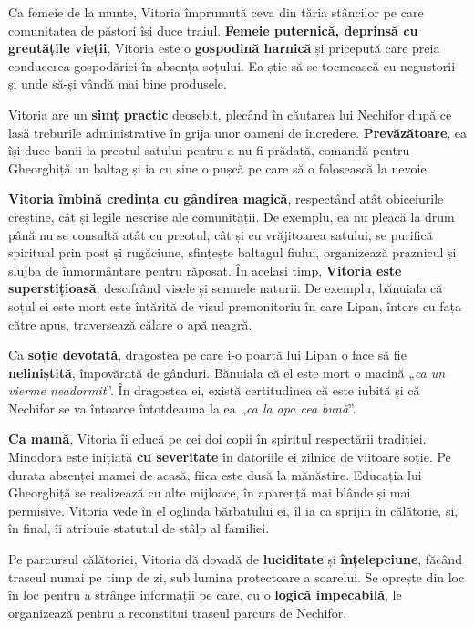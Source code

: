 \documentclass{article}
\newcommand{\qu}[1]{„\emph{#1}”}
\begin{document}
Ca femeie de la munte, Vitoria împrumută ceva din tăria stâncilor pe care comunitatea de păstori își duce traiul. \textbf{Femeie puternică, deprinsă cu greutățile vieții}, Vitoria este o \textbf{gospodină harnică} și pricepută care preia conducerea gospodăriei în absența soțului. Ea știe să se tocmească cu negustorii și unde să-și vândă mai bine produsele.

Vitoria are un \textbf{simț practic} deosebit, plecând în căutarea lui Nechifor după ce lasă treburile administrative în grija unor oameni de încredere. \textbf{Prevăzătoare}, ea își duce banii la preotul satului pentru a nu fi prădată, comandă pentru Gheorghiță un baltag și ia cu sine o pușcă pe care să o folosească la nevoie.

\textbf{Vitoria îmbină credința cu gândirea magică}, respectând atât obiceiurile creștine, cât și legile nescrise ale comunității. De exemplu, ea nu pleacă la drum până nu se consultă atât cu preotul, cât și cu vrăjitoarea satului, se purifică spiritual prin post și rugăciune, sfințește baltagul fiului, organizează praznicul și slujba de înmormântare pentru răposat. În același timp, \textbf{Vitoria este superstițioasă}, descifrând visele și semnele naturii. De exemplu, bănuiala că soțul ei este mort este întărită de visul premonitoriu în care Lipan, întors cu fața către apus, traversează călare o apă neagră.

Ca \textbf{soție devotată}, dragostea pe care i-o poartă lui Lipan o face să fie \textbf{neliniștită}, împovărată de gânduri. Bănuiala că el este mort o macină \qu{ca un vierme neadormit}. În dragostea ei, există certitudinea că este iubită și că Nechifor se va întoarce întotdeauna la ea \qu{ca la apa cea bună}.

\textbf{Ca mamă}, Vitoria îi educă pe cei doi copii în spiritul respectării tradiției. Minodora este inițiată \textbf{cu severitate} în datoriile ei zilnice de viitoare soție. Pe durata absenței mamei de acasă, fiica este dusă la mănăstire. Educația lui Gheorghiță se realizează cu alte mijloace, în aparență mai blânde și mai permisive. Vitoria vede în el oglinda bărbatului ei, îl ia ca sprijin în călătorie, și, în final, îi atribuie statutul de stâlp al familiei.

Pe parcursul călătoriei, Vitoria dă dovadă de \textbf{luciditate} și \textbf{înțelepciune}, făcând traseul numai pe timp de zi, sub lumina protectoare a soarelui. Se oprește din loc în loc pentru a strânge informații pe care, cu o \textbf{logică impecabilă}, le organizează pentru a reconstitui traseul parcurs de Nechifor.
\end{document}
